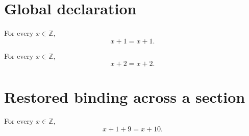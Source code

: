 \documentclass{article}
\newcommand{\localvalue}{1}
\newcommand{\localvaluelong}{9}
\begin{document}
\section{Global declaration}
\begin{theorem}\label{scope:global}
For every $x\in\mathbb{Z}$, \[x+\localvalue=x+1.\]
\end{theorem}
{\renewcommand{\localvalue}{2}
\begin{theorem}\label{scope:local}
For every $x\in\mathbb{Z}$, \[x+\localvalue=x+2.\]
\end{theorem}}
\section{Restored binding across a section}
\begin{theorem}\label{scope:restored}
For every $x\in\mathbb{Z}$, \[x+\localvalue+\localvaluelong=x+10.\]
\end{theorem}
\end{document}
